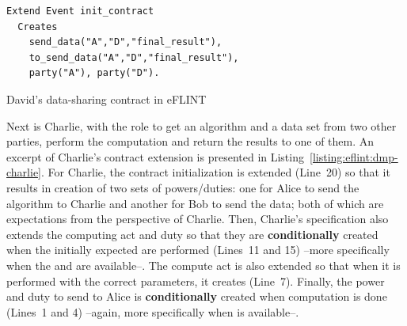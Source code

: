 \begin{listing}[h]
\centering
\begin{tcolorbox}[left=2pt,right=2pt,top=2pt,bottom=2pt]
\begin{verbatim}
Extend Event init_contract
  Creates  
    send_data("A","D","final_result"),
    to_send_data("A","D","final_result"),
    party("A"), party("D").
\end{verbatim}
\end{tcolorbox}
\caption{David's data-sharing contract in eFLINT}
\label{listing:eflint:dmp-david}
\end{listing}

Next is Charlie, with the role to get an algorithm and a data set from two other parties, perform the computation and return the results to one of them. An excerpt of Charlie's contract extension is presented in Listing~\ref{listing:eflint:dmp-charlie}. For Charlie, the contract initialization is extended (Line~20) so that it results in creation of two sets of powers/duties: one for Alice to send the algorithm to Charlie and another for Bob to send the data; both of which are expectations from the perspective of Charlie. Then, Charlie's specification also extends the computing act and duty so that they are \textbf{conditionally} created when the initially expected  are performed (Lines~11 and 15) --more specifically when the  and  are available--. The compute act is also extended so that when it is performed with the correct parameters, it creates  (Line~7). Finally, the power and duty to send  to Alice is \textbf{conditionally} created when computation is done (Lines~1 and 4) --again, more specifically when  is available--. 

